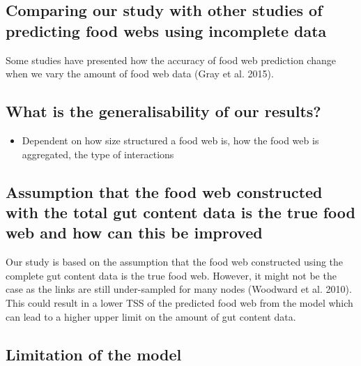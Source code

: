 \documentclass{article}
\begin{document}
\hypertarget{comparing-our-study-with-other-studies-of-predicting-food-webs-using-incomplete-data}{%
\subsection{Comparing our study with other studies of predicting food
webs using incomplete
data}\label{comparing-our-study-with-other-studies-of-predicting-food-webs-using-incomplete-data}}

Some studies have presented how the accuracy of food web prediction
change when we vary the amount of food web data (Gray et al. 2015).

\hypertarget{what-is-the-generalisability-of-our-results}{%
\subsection{What is the generalisability of our
results?}\label{what-is-the-generalisability-of-our-results}}

\begin{itemize}
\tightlist
\item
  Dependent on how size structured a food web is, how the food web is
  aggregated, the type of interactions
\end{itemize}

\hypertarget{assumption-that-the-food-web-constructed-with-the-total-gut-content-data-is-the-true-food-web-and-how-can-this-be-improved}{%
\subsection{Assumption that the food web constructed with the total gut
content data is the true food web and how can this be
improved}\label{assumption-that-the-food-web-constructed-with-the-total-gut-content-data-is-the-true-food-web-and-how-can-this-be-improved}}

Our study is based on the assumption that the food web constructed using
the complete gut content data is the true food web. However, it might
not be the case as the links are still under-sampled for many nodes
(Woodward et al. 2010). This could result in a lower TSS of the
predicted food web from the model which can lead to a higher upper limit
on the amount of gut content data.

\hypertarget{limitation-of-the-model}{%
\subsection{Limitation of the model}\label{limitation-of-the-model}}
\end{document}
